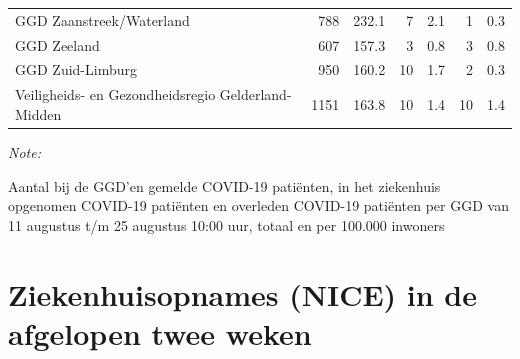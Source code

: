 \documentclass[
  english,
  man,floatsintext]{apa6}
\begin{document}
\begin{table}
\begin{threeparttable}
\begin{tabular}{lrrrrrr}
GGD Zaanstreek/Waterland & 788 & 232.1 & 7 & 2.1 & 1 & 0.3\\
GGD Zeeland & 607 & 157.3 & 3 & 0.8 & 3 & 0.8\\
GGD Zuid-Limburg & 950 & 160.2 & 10 & 1.7 & 2 & 0.3\\
Veiligheids- en Gezondheidsregio Gelderland-Midden & 1151 & 163.8 & 10 & 1.4 & 10 & 1.4\\
\bottomrule
\end{tabular}
\begin{tablenotes}
\item \textit{Note: } 
\item Aantal bij de GGD’en gemelde COVID-19 patiënten, in het ziekenhuis opgenomen COVID-19 patiënten en overleden COVID-19 patiënten per GGD van 11 augustus t/m 25 augustus 10:00 uur, totaal en per 100.000 inwoners
\end{tablenotes}
\end{threeparttable}
\endgroup{}
\end{table}

\newpage

\hypertarget{ziekenhuisopnames-nice-in-de-afgelopen-twee-weken}{%
\section{Ziekenhuisopnames (NICE) in de afgelopen twee weken}\label{ziekenhuisopnames-nice-in-de-afgelopen-twee-weken}}
\end{document}
